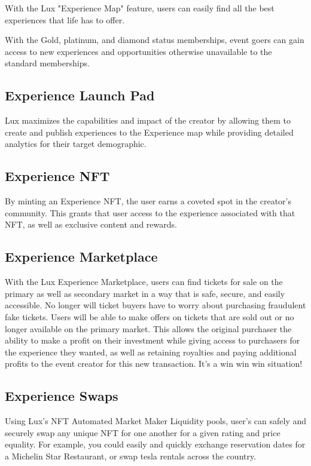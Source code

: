 \documentclass[11pt]{article}
\begin{document}
With the Lux "Experience Map" feature, users can easily find all the best experiences that life has to offer.


With the Gold, platinum, and diamond status memberships, event goers can gain access to new experiences and opportunities otherwise unavailable to the standard memberships.


\subsection{Experience Launch Pad}

Lux maximizes the capabilities and impact of the creator by allowing them to create and publish experiences to the Experience map while providing detailed analytics for their target demographic.


\subsection{Experience NFT}

By minting an Experience NFT, the user earns a coveted spot in the creator's community. This grants that user access to the experience associated with that NFT, as well as exclusive content and rewards.


\subsection{Experience Marketplace}

With the Lux Experience Marketplace, users can find tickets for sale on the primary as well as secondary market in a way that is safe, secure, and easily accessible. No longer will ticket buyers have to worry about purchasing fraudulent fake tickets. Users will be able to make offers on tickets that are sold out or no longer available on the primary market. This allows the original purchaser the ability to make a profit on their investment while giving access to purchasers for the experience they wanted, as well as retaining royalties and paying additional profits to the event creator for this new transaction. It's a win win win situation!


\subsection{Experience Swaps}

Using Lux's NFT Automated Market Maker Liquidity pools, user's can safely and securely swap any unique NFT for one another for a given rating and price equality.  For example, you could easily and quickly exchange reservation dates for a Michelin Star Restaurant, or swap tesla rentals across the country.
\end{document}
